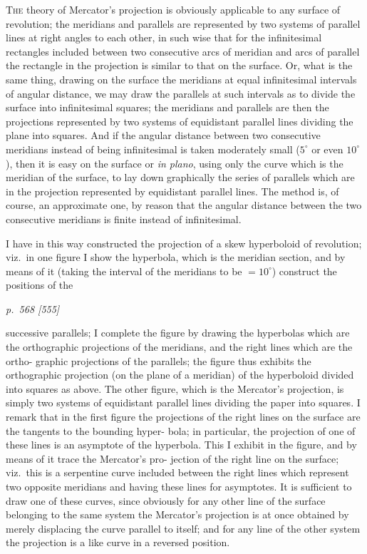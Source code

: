 \documentclass[11pt,a4paper]{book}
\begin{document}
\textsc{The} theory of Mercator's projection is obviously applicable to any surface of
revolution; the meridians and parallels are represented by two systems of parallel lines
at right angles to each other, in such wise that for the infinitesimal rectangles
included between two consecutive arcs of meridian and arcs of parallel the rectangle in
the projection is similar to that on the surface.  Or, what is the same thing, drawing
on the surface the meridians at equal infinitesimal intervals of angular distance, we
may draw the parallels at such intervals as to divide the surface into infinitesimal
squares; the meridians and parallels are then the projections represented by two
systems of equidistant parallel lines dividing the plane into squares.  And if the
angular distance between two consecutive meridians instead of being infinitesimal is
taken moderately small ($5^{\circ}$ or even $10^{\circ}$), then it is easy on the surface or \emph{in plano},
using only the curve which is the meridian of the surface, to lay down graphically
the series of parallels which are in the projection represented by equidistant parallel
lines.  The method is, of course, an approximate one, by reason that the angular distance
between the two consecutive meridians is finite instead of infinitesimal.

\bigskip

I have in this way constructed the projection of a skew hyperboloid of revolution;
viz.\ in one figure I show the hyperbola, which is the meridian section, and by means
of it (taking the interval of the meridians to be $= 10^{\circ}$) construct the positions of the

\clearpage


\noindent
\textit{p.~568 [555]}
\smallskip

\noindent
successive parallels; I complete the figure by drawing the hyperbolas which are the
orthographic projections of the meridians, and the right lines which are the ortho-
graphic projections of the parallels; the figure thus exhibits the orthographic projection
(on the plane of a meridian) of the hyperboloid divided into squares as above.  The
other figure, which is the Mercator's projection, is simply two systems of equidistant
parallel lines dividing the paper into squares.  I remark that in the first figure the
projections of the right lines on the surface are the tangents to the bounding hyper-
bola; in particular, the projection of one of these lines is an asymptote of the
hyperbola.  This I exhibit in the figure, and by means of it trace the Mercator's pro-
jection of the right line on the surface; viz.\ this is a serpentine curve included
between the right lines which represent two opposite meridians and having these lines
for asymptotes.  It is sufficient to draw one of these curves, since obviously for any
other line of the surface belonging to the same system the Mercator's projection is
at once obtained by merely displacing the curve parallel to itself; and for any line of
the other system the projection is a like curve in a reversed position.
\end{document}
